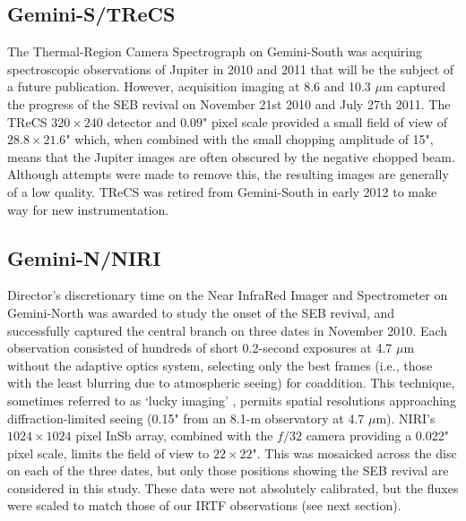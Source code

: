 \documentclass[final,authoryear,5p,times,twocolumn]{elsarticle}
\begin{document}
\subsection{Gemini-S/TReCS}
The Thermal-Region Camera Spectrograph \citep[TReCS,][]{05debuizer} on Gemini-South was acquiring spectroscopic observations of Jupiter in 2010 and 2011 that will be the subject of a future publication.  However, acquisition imaging at 8.6 and 10.3 $\mu$m captured the progress of the SEB revival on November 21st 2010 and July 27th 2011.  The TReCS $320\times240$ detector and $0.09$" pixel scale provided a small field of view of $28.8\times21.6$" which, when combined with the small chopping amplitude of 15", means that the Jupiter images are often obscured by the negative chopped beam.  Although attempts were made to remove this, the resulting images are generally of a low quality.  TReCS was retired from Gemini-South in early 2012 to make way for new instrumentation.  

\subsection{Gemini-N/NIRI}
Director's discretionary time on the Near InfraRed Imager and Spectrometer \citep[NIRI,][]{03hodapp} on Gemini-North was awarded to study the onset of the SEB revival, and successfully captured the central branch on three dates in November 2010.  Each observation consisted of hundreds of short 0.2-second exposures at 4.7 $\mu$m without the adaptive optics system, selecting only the best frames (i.e., those with the least blurring due to atmospheric seeing) for coaddition.  This technique, sometimes referred to as `lucky imaging' \citep[e.g.,][]{14mousis_proam}, permits spatial resolutions approaching diffraction-limited seeing (0.15" from an 8.1-m observatory at 4.7 $\mu$m).  NIRI's $1024\times1024$ pixel InSb array, combined with the $f/32$ camera providing a 0.022" pixel scale, limits the field of view to $22\times22$".  This was mosaicked across the disc on each of the three dates, but only those positions showing the SEB revival are considered in this study.  These data were not absolutely calibrated, but the fluxes were scaled to match those of our IRTF observations (see next section).
\end{document}
